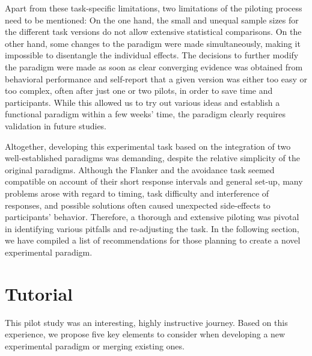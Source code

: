 \documentclass[twocolumn, serif, authordate, review]{jote-article}
\begin{document}
Apart from these task-specific limitations, two limitations of the piloting process need to be mentioned: On the one hand, the small and unequal sample sizes for the different task versions do not allow extensive statistical comparisons. On the other hand, some changes to the paradigm were made simultaneously, making it impossible to disentangle the individual effects. The decisions to further modify the paradigm were made as soon as clear converging evidence was obtained from behavioral performance and self-report that a given version was either too easy or too complex, often after just one or two pilots, in order to save time and participants. While this allowed us to try out various ideas and establish a functional paradigm within a few weeks' time, the paradigm clearly requires validation in future studies.

Altogether, developing this experimental task based on the integration of two well-established paradigms was demanding, despite the relative simplicity of the original paradigms. Although the Flanker and the avoidance task seemed compatible on account of their short response intervals and general set-up, many problems arose with regard to timing, task difficulty and interference of responses, and possible solutions often caused unexpected side-effects to participants' behavior. Therefore, a thorough and extensive piloting was pivotal in identifying various pitfalls and re-adjusting the task. In the following section, we have compiled a list of recommendations for those planning to create a novel experimental paradigm.


{}
\section*{Tutorial} 
\gotoreview
\label{sec:tutorial}

\noindent 
This pilot study was an interesting, highly instructive journey. Based on this experience, we propose five key elements to consider when developing a new experimental paradigm or merging existing ones.
\end{document}

